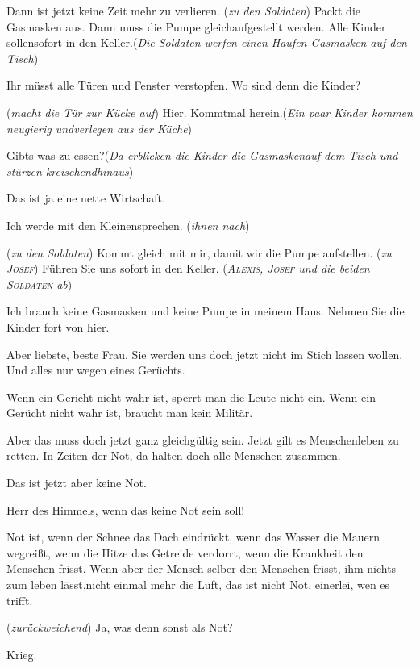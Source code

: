 \documentclass[
	final,
	a4paper,
	ngerman,
	mpinclude = true, %
	twoside = true,
	open = right,
	cleardoublepage = plain,
	DIV = 13,
	BCOR = 1cm,
	titlepage = firstiscover,
	]{scrbook}
\newcommand{\direction}[1]{(\textit{#1})}
\newcommand{\thecharacter}[1]{\textup{\textsc{#1}}\xspace}
\newcommand{\theBarbara}{\thecharacter{Barbara}}
\newcommand{\theJosef}{\thecharacter{Josef}}
\newcommand{\theAlexis}{\thecharacter{Alexis}}
\newcommand{\theSoldaten}{\thecharacter{Soldaten}}
\newcommand{\character}[1]{\item[#1]}
\newcommand{\Barbara}{\character{\theBarbara}}
\newcommand{\Josef}{\character{\theJosef}}
\newcommand{\Generaldirektor}{\character{Direktor}}
\newcommand{\Alexis}{\character{\theAlexis}}
\newcommand{\Heilsarmeeschwester}{\character{Schwester}}
\newcommand{\Junge}[1]{\character{Junge #1}}
\begin{document}
\begin{play}
\Alexis
Dann ist jetzt keine Zeit mehr zu verlieren. \direction{zu den Soldaten} Packt die Gasmasken aus. Dann muss die Pumpe gleichaufgestellt werden. Alle Kinder sollensofort in den Keller.\direction{Die Soldaten werfen einen Haufen Gasmasken auf den Tisch}
\Generaldirektor
Ihr müsst alle Türen und Fenster verstopfen. Wo sind denn die Kinder?

\Josef
\direction{macht die Tür zur Kücke auf} Hier. Kommtmal herein.\direction{Ein paar Kinder kommen neugierig undverlegen aus der Küche}

\Junge{5}
Gibts was zu essen?\direction{Da erblicken die Kinder die Gasmaskenauf dem Tisch und stürzen kreischendhinaus}

\Alexis
Das ist ja eine nette Wirtschaft.

\Heilsarmeeschwester
Ich werde mit den Kleinensprechen. \direction{ihnen nach}

\Alexis
\direction{zu den Soldaten} Kommt gleich mit mir, damit wir die Pumpe aufstellen. \direction{zu \theJosef} Führen Sie uns sofort in den Keller. \direction{\theAlexis, \theJosef und die beiden \theSoldaten ab}

\Barbara
Ich brauch keine Gasmasken und keine Pumpe in meinem Haus. Nehmen Sie die Kinder fort von hier.

\Generaldirektor
Aber liebste, beste Frau, Sie werden uns doch jetzt nicht im Stich lassen wollen. Und alles nur wegen eines Gerüchts.

\Barbara
Wenn ein Gericht nicht wahr ist, sperrt man die Leute nicht ein. Wenn ein Gerücht nicht wahr ist, braucht man kein Militär.

\Generaldirektor
Aber das muss doch jetzt ganz gleichgültig sein. Jetzt gilt es Menschenleben zu retten. In Zeiten der Not, da halten doch alle Menschen zusammen.---

\Barbara
Das ist jetzt aber keine Not.

\Generaldirektor
Herr des Himmels, wenn das keine Not sein soll!

\Barbara
Not ist, wenn der Schnee das Dach eindrückt, wenn das Wasser die Mauern wegreißt, wenn die Hitze das Getreide verdorrt, wenn die Krankheit den Menschen frisst. Wenn aber der Mensch selber den Menschen frisst, ihm nichts zum leben lässt,nicht einmal mehr die Luft, das ist nicht Not, einerlei, wen es trifft.

\Generaldirektor
\direction{zurückweichend} Ja, was denn sonst als Not?

\Barbara
Krieg.


\end{play}
\end{document}
